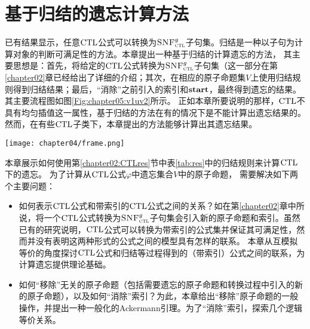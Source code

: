 \section{基于归结的遗忘计算方法}
\label{chapter05:sec:resolution}
	已有结果显示，任意$\textrm{CTL}$公式可以转换为${\textsc{SNF}_{\textsc{ctl}}^g}$子句集。归结是一种以子句为计算对象的判断可满足性的方法。本章提出一种基于归结的计算遗忘的方法，
	其主要思想是：首先，将给定的$\textrm{CTL}$公式转换为${\textsc{SNF}_{\textsc{ctl}}^g}$子句集（这一部分在第\ref{chapter02}章已经给出了详细的介绍；其次，在相应的原子命题集$V$上使用归结规则得到归结结果；最后，“消除”之前引入的索引和$\textbf{start}$，最终得到遗忘的结果。其主要流程图如图\ref{Fig:chapter05:v1uv2}所示。
	正如本章所要说明的那样，$\textrm{CTL}$不具有均匀插值这一属性，基于归结的方法在有的情况下是不能计算出遗忘结果的。然而，在有些$\textrm{CTL}$子类下，本章提出的方法能够计算出其遗忘结果。
\begin{figure*}[!htb]
	\centering
	\texttt{[image: chapter04/frame.png]}\\
	\caption{基于归结的遗忘的主要流程图}
	\label{Fig:chapter05:v1uv2}
\end{figure*}

本章展示如何使用第\ref{chapter02:CTLres}节中表\ref{tab:res}中的归结规则来计算$\textrm{CTL}$下的遗忘。
为了计算从$\textrm{CTL}$公式$\varphi$中遗忘集合$V$中的原子命题，
需要解决如下两个主要问题：
\begin{itemize}
	\item[(1)] 如何表示$\textrm{CTL}$公式和带索引的$\textrm{CTL}$公式之间的关系？如在第\ref{chapter02}章中所说，将一个$\textrm{CTL}$公式转换为${\textsc{SNF}_{\textsc{ctl}}^g}$子句集会引入新的原子命题和索引。虽然已有的研究说明，$\textrm{CTL}$公式可以转换为带索引的公式集并保证其可满足性，然而并没有表明这两种形式的公式之间的模型具有怎样的联系。
	本章从互模拟等价的角度探讨$\textrm{CTL}$公式和归结等过程得到的（带索引）公式之间的联系，为计算遗忘提供理论基础。
	\item[(2)] 如何“移除”无关的原子命题（包括需要遗忘的原子命题和转换过程中引入的新的原子命题），以及如何“消除”索引？为此，本章给出“移除”原子命题的一般操作，并提出一种一般化的Ackermann引理。为了“消除”索引，探索几个逻辑等价关系。%
\end{itemize}

